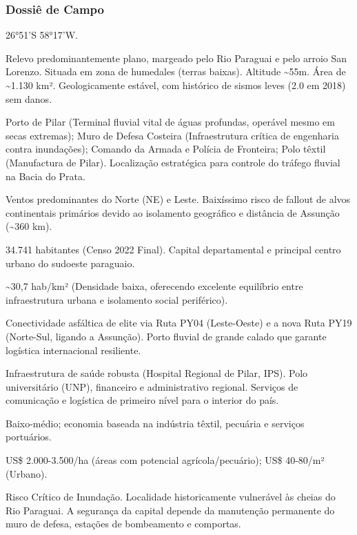 \subsubsection{Dossiê de Campo}
\begin{description}[style=nextline,leftmargin=0.5cm,font=\bfseries]
\item[Coordenadas]  26°51'S 58°17'W.
\item[Topografia]  Relevo predominantemente plano, margeado pelo Rio Paraguai e pelo arroio San Lorenzo. Situada em zona de humedales (terras baixas). Altitude \textasciitilde 55m. Área de \textasciitilde 1.130 km². Geologicamente estável, com histórico de sismos leves (2.0 em 2018) sem danos.
\item[Alvos Estratégicos]  Porto de Pilar (Terminal fluvial vital de águas profundas, operável mesmo em secas extremas); Muro de Defesa Costeira (Infraestrutura crítica de engenharia contra inundações); Comando da Armada e Polícia de Fronteira; Polo têxtil (Manufactura de Pilar). Localização estratégica para controle do tráfego fluvial na Bacia do Prata.
\item[Fallout]  Ventos predominantes do Norte (NE) e Leste. Baixíssimo risco de fallout de alvos continentais primários devido ao isolamento geográfico e distância de Assunção (\textasciitilde 360 km).
\item[População]  34.741 habitantes (Censo 2022 Final). Capital departamental e principal centro urbano do sudoeste paraguaio.
\item[Densidade]  \textasciitilde 30,7 hab/\allowbreak km² (Densidade baixa, oferecendo excelente equilíbrio entre infraestrutura urbana e isolamento social periférico).
\item[Vias de Acesso]  Conectividade asfáltica de elite via Ruta PY04 (Leste-Oeste) e a nova Ruta PY19 (Norte-Sul, ligando a Assunção). Porto fluvial de grande calado que garante logística internacional resiliente.
\item[Serviços]  Infraestrutura de saúde robusta (Hospital Regional de Pilar, IPS). Polo universitário (UNP), financeiro e administrativo regional. Serviços de comunicação e logística de primeiro nível para o interior do país.
\item[Custo de Vida]  Baixo-médio; economia baseada na indústria têxtil, pecuária e serviços portuários.
\item[Preço da Terra]  US\$ 2.000-3.500/\allowbreak ha (áreas com potencial agrícola/\allowbreak pecuário); US\$ 40-80/\allowbreak m² (Urbano).
\item[Hidrologia]  Risco Crítico de Inundação. Localidade historicamente vulnerável às cheias do Rio Paraguai. A segurança da capital depende da manutenção permanente do muro de defesa, estações de bombeamento e comportas.

\end{description}
